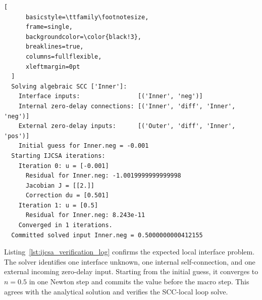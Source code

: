 \begin{listing}[ht]
  \begin{lstlisting}[
      basicstyle=\ttfamily\footnotesize,
      frame=single,
      backgroundcolor=\color{black!3},
      breaklines=true,
      columns=fullflexible,
      xleftmargin=0pt
  ]
  Solving algebraic SCC ['Inner']:
    Interface inputs:                [('Inner', 'neg')]
    Internal zero-delay connections: [('Inner', 'diff', 'Inner', 'neg')]
    External zero-delay inputs:      [('Outer', 'diff', 'Inner', 'pos')]
    Initial guess for Inner.neg = -0.001
  Starting IJCSA iterations:
    Iteration 0: u = [-0.001]
      Residual for Inner.neg: -1.0019999999999998
      Jacobian J = [[2.]]
      Correction du = [0.501]
    Iteration 1: u = [0.5]
      Residual for Inner.neg: 8.243e-11
    Converged in 1 iterations.
  Committed solved input Inner.neg = 0.5000000000412155
  \end{lstlisting}
  \caption[Solver trace for algebraic-loop verification.]{\ac{IJCSA} solver trace for the algebraic-loop verification scenario.
  The local solver identifies the scalar interface problem and converges to the analytical solution in one Newton step.}
  \label{lst:ijcsa_verification_log}
\end{listing}

Listing~\ref{lst:ijcsa_verification_log} confirms the expected local interface problem.
The solver identifies one interface unknown, one internal self-connection, and one external incoming zero-delay input.
Starting from the initial guess, it converges to $n=0.5$ in one Newton step and commits the value before the macro step.
This agrees with the analytical solution and verifies the \ac{SCC}-local loop solve.
